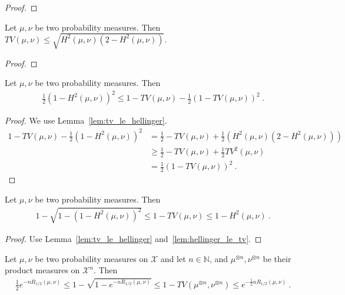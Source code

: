 \begin{proof}
\end{proof}

\begin{lemma}
  \label{lem:tv_le_hellinger}
  Let $\mu, \nu$ be two probability measures. Then $TV(\mu, \nu) \le \sqrt{H^2(\mu, \nu)(2 - H^2(\mu, \nu))}$.
\end{lemma}

\begin{proof}
\end{proof}

\begin{corollary}
  \label{cor:one_sub_hellinger_squared_le_one_sub_tv}
  Let $\mu, \nu$ be two probability measures. Then
  \begin{align*}
  \frac{1}{2}(1 - H^2(\mu, \nu))^2 \le 1 - TV(\mu, \nu) - \frac{1}{2}(1 - TV(\mu, \nu))^2
  \: .
  \end{align*}
\end{corollary}

\begin{proof}
We use Lemma~\ref{lem:tv_le_hellinger}.
\begin{align*}
1 - TV(\mu, \nu) - \frac{1}{2}(1 - H^2(\mu, \nu))^2
&= \frac{1}{2} - TV(\mu, \nu) + \frac{1}{2}(H^2(\mu, \nu)(2 - H^2(\mu, \nu)))
\\
&\ge \frac{1}{2} - TV(\mu, \nu) + \frac{1}{2}TV^2(\mu, \nu)
\\
&= \frac{1}{2}(1 - TV(\mu, \nu))^2
\: .
\end{align*}
\end{proof}

\begin{corollary}
  \label{cor:one_sub_hellinger_le_one_sub_tv}
  Let $\mu, \nu$ be two probability measures. Then
  \begin{align*}
  1 - \sqrt{1 - (1 - H^2(\mu, \nu))^2} \le 1 - TV(\mu, \nu) \le 1 - H^2(\mu, \nu)
  \: .
  \end{align*}
\end{corollary}

\begin{proof}
Use Lemma~\ref{lem:tv_le_hellinger} and~\ref{lem:hellinger_le_tv}.
\end{proof}

\begin{corollary}
  \label{cor:one_sub_tv_bound_renyi}
  Let $\mu, \nu$ be two probability measures on $\mathcal X$ and let $n \in \mathbb{N}$, and $\mu^{\otimes n}, \nu^{\otimes n}$ be their product measures on $\mathcal X^n$. Then
  \begin{align*}
  \frac{1}{2}e^{-n R_{1/2}(\mu, \nu)} \le 1 - \sqrt{1 - e^{-n R_{1/2}(\mu, \nu)}} \le 1 - TV(\mu^{\otimes n}, \nu^{\otimes n}) \le e^{-\frac{1}{2} n R_{1/2}(\mu, \nu)}
  \: .
  \end{align*}
\end{corollary}

